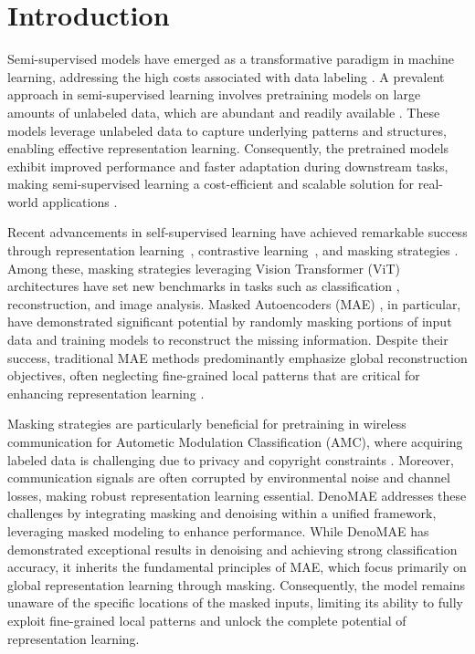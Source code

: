 \section{Introduction}

Semi-supervised models have emerged as a transformative paradigm in machine learning, addressing the high costs associated with data labeling \cite{zhang2024maskmatch, pmlr-v182-poulain22a}. A prevalent approach in semi-supervised learning involves pretraining models on large amounts of unlabeled data, which are abundant and readily available \cite{chen2020bigselfsupervisedmodelsstrong, xu2022revisitingpretrainingsemisupervisedlearning}. These models leverage unlabeled data to capture underlying patterns and structures, enabling effective representation learning. Consequently, the pretrained models exhibit improved performance and faster adaptation during downstream tasks, making semi-supervised learning a cost-efficient and scalable solution for real-world applications \cite{cai2022semisupervisedvisiontransformersscale}.

Recent advancements in self-supervised learning have achieved remarkable success through representation learning~\cite{grill2020bootstraplatentnewapproach, chen2020exploringsimplesiameserepresentation}, contrastive learning~\cite{chen2020simple, khosla2020supervised}, and masking strategies \cite{yin2024stablemask}. Among these, masking strategies leveraging Vision Transformer (ViT) \cite{dosovitskiy2020image} architectures have set new benchmarks in tasks such as classification , reconstruction, and image analysis. Masked Autoencoders (MAE) \cite{he2022masked}, in particular, have demonstrated significant potential by randomly masking portions of input data and training models to reconstruct the missing information. Despite their success, traditional MAE methods predominantly emphasize global reconstruction objectives, often neglecting fine-grained local patterns that are critical for enhancing representation learning \cite{yue2023understanding}.

Masking strategies are particularly beneficial for pretraining in wireless communication for Autometic Modulation Classification (AMC), where acquiring labeled data is challenging due to privacy and copyright constraints \cite{zhao2024vit, zayat2023transformer}. Moreover, communication signals are often corrupted by environmental noise and channel losses, making robust representation learning essential. DenoMAE \cite{faysal2025denomae} addresses these challenges by integrating masking and denoising within a unified framework, leveraging masked modeling to enhance performance. While DenoMAE has demonstrated exceptional results in denoising and achieving strong classification accuracy, it inherits the fundamental principles of MAE, which focus primarily on global representation learning through masking. Consequently, the model remains unaware of the specific locations of the masked inputs, limiting its ability to fully exploit fine-grained local patterns and unlock the complete potential of representation learning.

